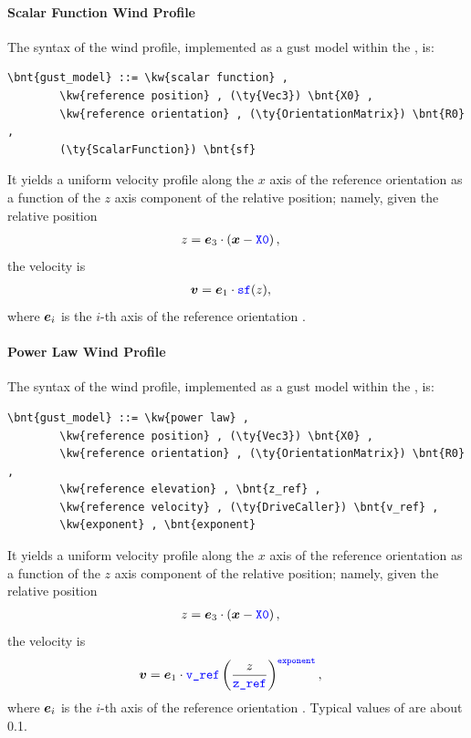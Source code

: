 \paragraph{Scalar Function Wind Profile}
The syntax of the  wind profile,
implemented as a gust model within the , is:
\begin{Verbatim}[commandchars=\\\{\}]
    \bnt{gust_model} ::= \kw{scalar function} ,
        \kw{reference position} , (\ty{Vec3}) \bnt{X0} ,
        \kw{reference orientation} , (\ty{OrientationMatrix}) \bnt{R0} ,
        (\ty{ScalarFunction}) \bnt{sf}
\end{Verbatim}
It yields a uniform velocity profile along the $x$ axis of the
reference orientation as a function of the $z$ axis component
of the relative position; namely, given the relative position
\begin{align}
	z &= \boldsymbol{e}_3 \cdot \left( \boldsymbol{x} - \textcolor{blue}{\texttt{X0}} \right)
	,
\end{align}
the velocity is
\begin{align}
	\boldsymbol{v}
	&=
	\boldsymbol{e}_1 \cdot \textcolor{blue}{\texttt{sf}}(z)
	,
\end{align}
where $\boldsymbol{e}_i$ is the $i$-th axis of the reference orientation .



\paragraph{Power Law Wind Profile}
The syntax of the  wind profile, implemented as a gust model
within the , is:
\begin{Verbatim}[commandchars=\\\{\}]
    \bnt{gust_model} ::= \kw{power law} ,
        \kw{reference position} , (\ty{Vec3}) \bnt{X0} ,
        \kw{reference orientation} , (\ty{OrientationMatrix}) \bnt{R0} ,
        \kw{reference elevation} , \bnt{z_ref} ,
        \kw{reference velocity} , (\ty{DriveCaller}) \bnt{v_ref} ,
        \kw{exponent} , \bnt{exponent}
\end{Verbatim}
It yields a uniform velocity profile along the $x$ axis of the
reference orientation as a function of the $z$ axis component
of the relative position; namely, given the relative position
\begin{align}
	z &= \boldsymbol{e}_3 \cdot \left( \boldsymbol{x} - \textcolor{blue}{\texttt{X0}} \right)
	,
\end{align}
the velocity is
\begin{align}
	\boldsymbol{v}
	&=
	\boldsymbol{e}_1 \cdot \textcolor{blue}{\texttt{v\_ref}} \left( \frac{z}{\textcolor{blue}{\texttt{z\_ref}}} \right)^{\textcolor{blue}{\texttt{exponent}}}
	,
\end{align}
where $\boldsymbol{e}_i$ is the $i$-th axis of the reference orientation .
Typical values of  are about 0.1.



